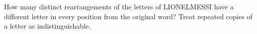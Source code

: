 How many distinct rearrangements of the letters of LIONELMESSI have a different letter in every position from the original word? Treat repeated copies of a letter as indistinguishable.

